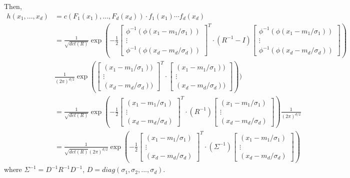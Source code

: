 \begin{refsection}
\begin{example}
\begin{itemize}
	Then,
\begin{align*}
h(x_1,...,x_d) &= c(F_1(x_1),...,F_d(x_d))\cdot f_1(x_1)\cdots f_d(x_d) \\
&= \frac{1}{\sqrt{det(R)}} \exp(-\frac{1}{2}
\begin{bmatrix}
\phi^{-1}(\phi(x_1-m_1/\sigma_1)) \\
\vdots\\
\phi^{-1}(\phi(x_d-m_d/\sigma_d))
\end{bmatrix}^T \cdot (R^{-1} - I) \begin{bmatrix}
\phi^{-1}(\phi(x_1-m_1/\sigma_1)) \\
\vdots\\
\phi^{-1}(\phi(x_d-m_d/\sigma_d))
\end{bmatrix})\\
&\frac{1}{(2\pi)^{d/2}}\exp(\begin{bmatrix}
(x_1-m_1/\sigma_1)) \\
\vdots\\
(x_d-m_d/\sigma_d))
\end{bmatrix}^T \cdot \begin{bmatrix}
(x_1-m_1/\sigma_1)) \\
\vdots\\
(x_d-m_d/\sigma_d))
\end{bmatrix}
)
)\\
&= \frac{1}{\sqrt{det(R)}} \exp(-\frac{1}{2}
\begin{bmatrix}
(x_1-m_1/\sigma_1) \\
\vdots\\
(x_d-m_d/\sigma_d)
\end{bmatrix}^T \cdot (R^{-1}) \begin{bmatrix}
(x_1-m_1/\sigma_1) \\
\vdots\\
(x_d-m_d/\sigma_d)
\end{bmatrix})
\frac{1}{(2\pi)^{d/2}}
\\
&= \frac{1}{\sqrt{det(R)}(2\pi)^{d/2}} \exp(-\frac{1}{2}
\begin{bmatrix}
(x_1-m_1/\sigma_1) \\
\vdots\\
(x_d-m_d/\sigma_d)
\end{bmatrix}^T \cdot (\Sigma^{-1}) \begin{bmatrix}
(x_1-m_1/\sigma_1) \\
\vdots\\
(x_d-m_d/\sigma_d)
\end{bmatrix})
\end{align*}
	where $\Sigma^{-1} = D^{-1}R^{-1}D^{-1}$, $D = diag(\sigma_1,\sigma_2,...,\sigma_d)$.
	

\end{itemize}
\end{example}
\end{refsection}
